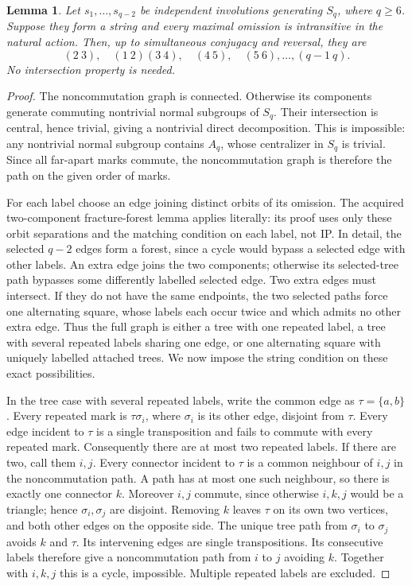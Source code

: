 \documentclass[11pt,a4paper]{article}
\newtheorem{lemma}{Lemma}
\begin{document}
\begin{lemma}\label{foreststring}
Let $s_1,\ldots,s_{q-2}$ be independent involutions generating
$S_q$, where $q\ge6$. Suppose they form a string and every
maximal omission is intransitive in the natural action.
Then, up to simultaneous conjugacy and reversal, they are
\[
 (2\ 3),\quad(1\ 2)(3\ 4),\quad(4\ 5),\quad
 (5\ 6),\ldots,(q-1\ q).                           \tag{2}
\]
No intersection property is needed.
\end{lemma}
\begin{proof}
The noncommutation graph is connected. Otherwise its components
generate commuting nontrivial normal subgroups of $S_q$.
Their intersection is central, hence trivial, giving a nontrivial
direct decomposition. This is impossible: any nontrivial normal
subgroup contains $A_q$, whose centralizer in $S_q$ is trivial.
Since all far-apart marks commute, the noncommutation graph
is therefore the path on the given order of marks.

For each label choose an edge joining distinct orbits of its
omission. The acquired two-component fracture-forest lemma applies
literally: its proof uses only these orbit separations and the
matching condition on each label, not IP. In detail, the selected
$q-2$ edges form a forest, since a cycle would bypass a selected
edge with other labels. An extra edge joins the two components;
otherwise its selected-tree path bypasses some differently labelled
selected edge. Two extra edges must intersect. If they do not have
the same endpoints, the two selected paths force one alternating
square, whose labels each occur twice and which admits no other
extra edge. Thus the full graph is either a tree with one repeated
label, a tree with several repeated labels sharing one edge, or
one alternating square with uniquely labelled attached trees.
We now impose the string condition on these exact possibilities.

In the tree case with several repeated labels, write the common
edge as $\tau=\{a,b\}$. Every repeated mark is $\tau\sigma_i$,
where $\sigma_i$ is its other edge, disjoint from $\tau$.
Every edge incident to $\tau$ is a single transposition and
fails to commute with every repeated mark. Consequently there
are at most two repeated labels. If there are two, call them
$i,j$. Every connector incident to $\tau$ is a common neighbour
of $i,j$ in the noncommutation path. A path has at most one
such neighbour, so there is exactly one connector $k$. Moreover
$i,j$ commute, since otherwise $i,k,j$ would be a triangle;
hence $\sigma_i,\sigma_j$ are disjoint. Removing $k$ leaves
$\tau$ on its own two vertices, and both other edges on the
opposite side. The unique tree path from $\sigma_i$ to
$\sigma_j$ avoids $k$ and $\tau$. Its intervening edges are
single transpositions. Its consecutive labels therefore give a
noncommutation path from $i$ to $j$ avoiding $k$. Together with
$i,k,j$ this is a cycle, impossible. Multiple repeated labels
are excluded.


\end{proof}
\end{document}
